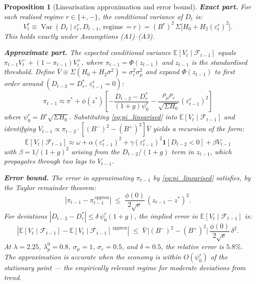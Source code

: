 \documentclass[12pt,a4paper]{article}
\newtheorem{proposition}[theorem]{Proposition}
\theoremstyle{definition}
\begin{document}
\begin{proposition}[Linearisation approximation and error bound]
\label{prop:linearisation}
\textbf{Exact part.} For each realised regime $r \in \{+,-\}$,
the conditional variance of $D_t$ is:
\begin{equation}
  V^r_t \equiv \operatorname{Var}(D_t \mid \varepsilon^r_t,
  D_{t-1},\, \text{regime}\,=r)
  = (B^r)^2\,\Sigma\bigl[H_0 + H_2(\varepsilon^r_t)^2\bigr].
  \label{eq:Vt_exact}
\end{equation}
This holds exactly under Assumptions (A1)--(A3).

\medskip
\noindent\textbf{Approximate part.} The expected conditional
variance $\mathbb{E}[V_t \mid \mathcal{F}_{t-1}]$ equals
$\pi_{t-1}V^-_t + (1-\pi_{t-1})V^+_t$, where $\pi_{t-1} =
\Phi(z_{t-1})$ and $z_{t-1}$ is the standardised threshold.
Define $\bar{V} \equiv \Sigma(H_0 + H_2\bar\sigma^2) =
\sigma^2_\varepsilon\sigma^2_\mu$ and expand $\Phi(z_{t-1})$ to
first order around $(D_{t-2} = D^*_r,\, \varepsilon^r_{t-1} = 0)$:
\begin{equation}
  \pi_{t-1} \approx \pi^* +
  \phi(z^*)\left[-\frac{D_{t-2} - D^*_r}{(1+g)\psi^r_0}
  - \frac{\rho_\mu\rho_\varepsilon}{\sqrt{\Sigma H_0}}
    (\varepsilon^r_{t-1})^2\right]
  \label{eq:pi_linearised}
\end{equation}
where $\psi^r_0 = B^r\sqrt{\Sigma H_0}$. Substituting
\eqref{eq:pi_linearised} into $\mathbb{E}[V_t \mid
\mathcal{F}_{t-1}]$ and identifying $V_{t-1} \propto
\pi_{t-2} \cdot [(B^-)^2 - (B^+)^2]\bar{V}$ yields a
recursion of the form:
\begin{equation}
  \mathbb{E}[V_t \mid \mathcal{F}_{t-1}]
  \approx \omega + \alpha(\varepsilon^r_{t-1})^2
  + \gamma(\varepsilon^r_{t-1})^2\mathbf{1}[D_{t-2}<0]
  + \beta V_{t-1}
  \label{eq:Vt_recursion_approx}
\end{equation}
with $\beta = 1/(1+g)^2$ arising from the $D_{t-2}/(1+g)$ term
in $z_{t-1}$, which propagates through two lags to $V_{t-1}$.

\medskip
\noindent\textbf{Error bound.} The error in approximating
$\pi_{t-1}$ by \eqref{eq:pi_linearised} satisfies, by the
Taylor remainder theorem:
\[
|\pi_{t-1} - \pi^{\,\mathrm{approx}}_{t-1}|
\;\leq\;
\frac{\phi(0)}{2\sqrt{e}}\,(z_{t-1} - z^*)^2.
\]
For deviations $|D_{t-2} - D^*_r| \leq \delta\,\psi^r_0(1+g)$,
the implied error in $\mathbb{E}[V_t \mid \mathcal{F}_{t-1}]$ is:
\[
\left|\mathbb{E}[V_t \mid \mathcal{F}_{t-1}]
  - \mathbb{E}[V_t \mid \mathcal{F}_{t-1}]^{\,\mathrm{approx}}\right|
\;\leq\;
\bar{V}\,\bigl|(B^-)^2 - (B^+)^2\bigr|
\,\frac{\phi(0)}{2\sqrt{e}}\,\delta^2.
\]
At $\lambda = 2.25$, $\lambda^0_p = 0.8$, $\sigma_\mu = 1$,
$\sigma_\varepsilon = 0.5$, and $\delta = 0.5$, the relative
error is $5.8\%$. The approximation is accurate when the
economy is within $O(\psi^r_0)$ of the stationary point ---
the empirically relevant regime for moderate deviations from
trend.
\end{proposition}
\end{document}
